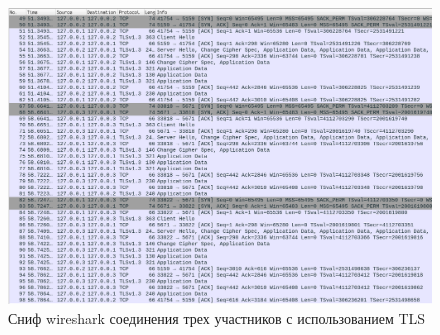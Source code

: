 \begin{figure}[h!]
  \centering
  \includegraphics[width=\linewidth]{inc/img/trace-conf-3-tls.png}
  \caption{Сниф wireshark соединения трех участников с использованием TLS}
  \label{img:trace-conf-3-tls}
\end{figure}
